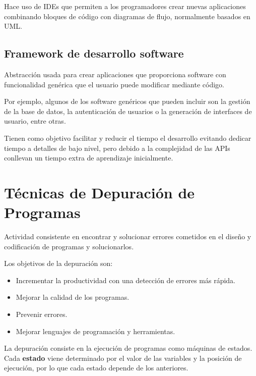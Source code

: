 \begin{definicion}
    Hace uso de IDEs que permiten a los programadores crear nuevas aplicaciones combinando bloques de código con diagramas de flujo, normalmente basados en UML.
\end{definicion}

\subsection{Framework de desarrollo software}
\begin{definicion} Abstracción usada para crear aplicaciones que proporciona software con funcionalidad genérica que el usuario puede modificar mediante código.
\end{definicion}

Por ejemplo, algunos de los software genéricos que pueden incluir son la gestión de la base de datos, la autenticación de usuarios o la generación de interfaces de usuario, entre otras.

Tienen como objetivo facilitar y reducir el tiempo el desarrollo evitando dedicar tiempo a detalles de bajo nivel, pero debido a la complejidad de las APIs conllevan un tiempo extra de aprendizaje inicialmente.



\section{Técnicas de Depuración de Programas}

\begin{definicion}[Depuración]
    Actividad consistente en encontrar y solucionar errores cometidos en el diseño y codificación de programas y solucionarlos.
\end{definicion}

Los objetivos de la depuración son:
\begin{itemize}
    \item Incrementar la productividad con una detección de errores más rápida.
    \item Mejorar la calidad de los programas.
    \item Prevenir errores.
    \item Mejorar lenguajes de programación y herramientas.
\end{itemize}


La depuración consiste en la ejecución de programas como máquinas de estados. Cada \textbf{estado} viene determinado por el valor de las variables y la posición de ejecución, por lo que cada estado depende de los anteriores.

